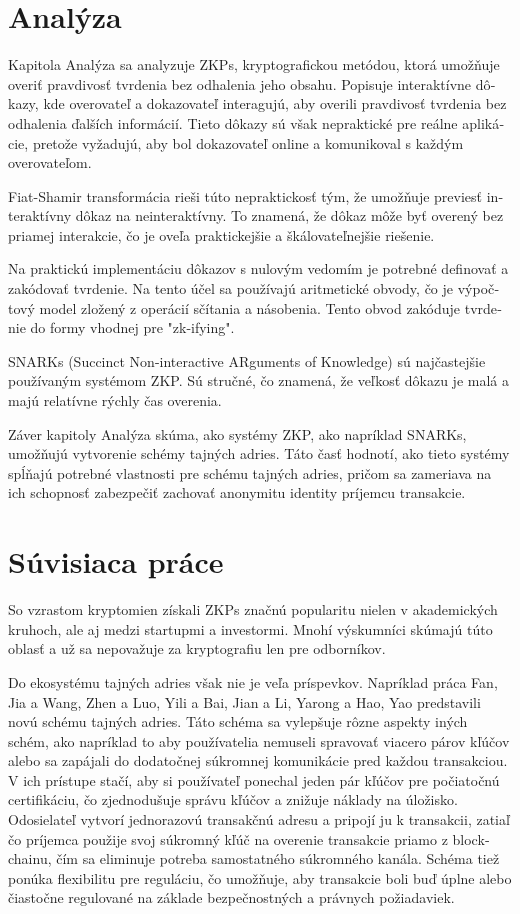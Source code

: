 \begin{otherlanguage}{slovak}
\section{Analýza}

Kapitola Analýza sa analyzuje ZKPs, kryptografickou metódou, ktorá umožňuje
overiť pravdivosť tvrdenia bez odhalenia jeho obsahu. Popisuje interaktívne
dôkazy, kde overovateľ a dokazovateľ interagujú, aby overili pravdivosť
tvrdenia bez odhalenia ďalších informácií. Tieto dôkazy sú však
nepraktické pre reálne aplikácie, pretože vyžadujú, aby bol dokazovateľ online
a komunikoval s každým overovateľom.

Fiat-Shamir transformácia rieši túto nepraktickosť tým, že umožňuje previesť
interaktívny dôkaz na neinteraktívny. To znamená, že dôkaz môže byť
overený bez priamej interakcie, čo je oveľa praktickejšie a škálovateľnejšie
riešenie.

Na praktickú implementáciu dôkazov s nulovým vedomím je potrebné definovať a
zakódovať tvrdenie. Na tento účel sa používajú aritmetické obvody, čo je
výpočtový model zložený z operácií sčítania a násobenia. Tento obvod zakóduje
tvrdenie do formy vhodnej pre "zk-ifying".

SNARKs (Succinct Non-interactive ARguments of Knowledge) sú najčastejšie
používaným systémom ZKP. Sú stručné, čo znamená, že veľkosť dôkazu je malá a
majú relatívne rýchly čas overenia.

Záver kapitoly Analýza skúma, ako systémy ZKP, ako napríklad SNARKs, umožňujú
vytvorenie schémy tajných adries. Táto
časť hodnotí, ako tieto systémy spĺňajú potrebné vlastnosti pre schému tajných
adries, pričom sa zameriava na ich schopnosť zabezpečiť zachovať anonymitu
identity príjemcu transakcie.

\section{Súvisiaca práce}

So vzrastom kryptomien získali ZKPs značnú popularitu nielen v akademických
kruhoch, ale aj medzi startupmi a investormi. Mnohí výskumníci skúmajú túto
oblasť a už sa nepovažuje za kryptografiu len pre odborníkov.

Do ekosystému tajných adries však nie je veľa príspevkov.
Napríklad práca Fan, Jia a Wang, Zhen a Luo, Yili a Bai, Jian
a Li, Yarong a Hao, Yao \cite{FanJiaWang2019} predstavili novú schému tajných adries.
Táto schéma sa vylepšuje rôzne aspekty iných schém, ako napríklad to aby používatelia
nemuseli spravovať viacero párov kľúčov alebo sa zapájali do
dodatočnej súkromnej komunikácie pred každou transakciou. V ich prístupe
stačí, aby si používateľ ponechal jeden pár kľúčov pre počiatočnú
certifikáciu, čo zjednodušuje správu kľúčov a znižuje náklady na úložisko.
Odosielateľ vytvorí jednorazovú transakčnú adresu a pripojí ju k transakcii,
zatiaľ čo príjemca použije svoj súkromný kľúč na overenie transakcie priamo z
blockchainu, čím sa eliminuje potreba samostatného súkromného kanála. Schéma
tiež ponúka flexibilitu pre reguláciu, čo umožňuje, aby transakcie boli buď
úplne alebo čiastočne regulované na základe bezpečnostných a právnych požiadaviek.


\end{otherlanguage}
